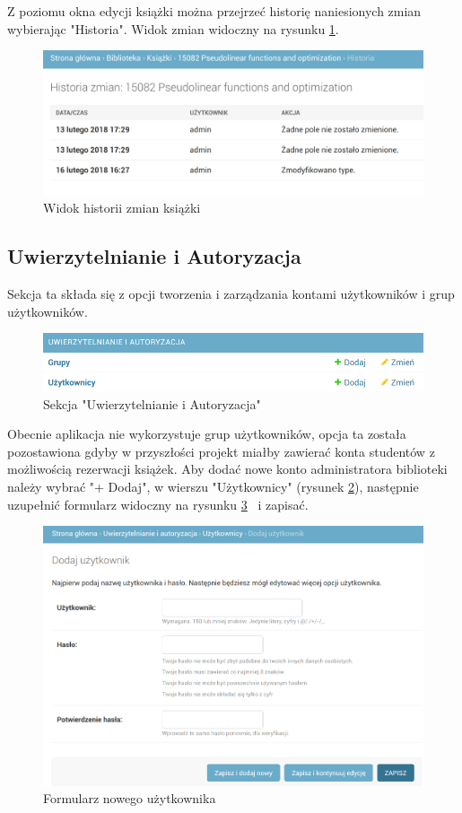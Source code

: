 \documentclass[twoside]{projektInzynierskiMS}
\begin{document}
Z poziomu okna edycji książki można przejrzeć historię naniesionych zmian wybierając "Historia". Widok zmian widoczny na rysunku \ref{fig:adminBookHistory}.

\begin{figure}[h]
  \centering
  \includegraphics[width=0.6\linewidth]{img/HistoriaZmian.png}
  \caption{Widok historii zmian książki}
  \label{fig:adminBookHistory}
\end{figure}


\subsection{Uwierzytelnianie i Autoryzacja}
Sekcja ta składa się z opcji tworzenia i zarządzania kontami użytkowników i grup użytkowników.

\begin{figure}[h]
  \centering
  \includegraphics[width=0.6\linewidth]{img/autoryzacja.png}
  \caption{Sekcja "Uwierzytelnianie i Autoryzacja"}
  \label{fig:authSection}
\end{figure}

 Obecnie aplikacja nie wykorzystuje grup użytkowników, opcja ta została pozostawiona gdyby w przyszłości projekt miałby zawierać konta studentów z możliwością rezerwacji książek. Aby dodać nowe konto administratora biblioteki należy wybrać "+ Dodaj", w wierszu "Użytkownicy" (rysunek \ref{fig:authSection}), następnie uzupełnić formularz widoczny na rysunku \ref{fig:newUserForm} ~i zapisać.

\begin{figure}[h]
  \centering
  \includegraphics[width=0.6\linewidth]{img/NowyAdminForm.png}
  \caption{Formularz nowego użytkownika}
  \label{fig:newUserForm}
\end{figure}
\end{document}
